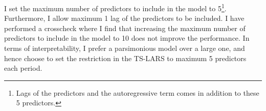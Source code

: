 I set the maximum number of predictors to include in the model to 5\footnote{Lags of the predictors and the autoregressive term comes in addition to these 5 predictors.}. Furthermore, I allow maximum 1 lag of the predictors to be included. I have performed a crosscheck where I find that increasing the maximum number of predictors to include in the model to 10 does not improve the performance. In terms of interpretability, I prefer a parsimonious model over a large one, and hence choose to set the restriction in the TS-LARS to maximum 5 predictors each period.
